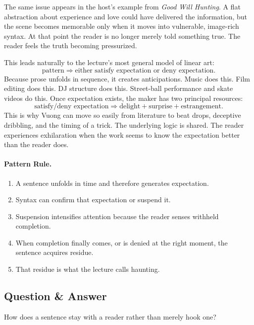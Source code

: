 The same issue appears in the host's example from \textit{Good Will Hunting}. A flat abstraction about experience and love could have delivered the information, but the scene becomes memorable only when it moves into vulnerable, image-rich syntax. At that point the reader is no longer merely told something true. The reader feels the truth becoming pressurized.

This leads naturally to the lecture's most general model of linear art:
\begin{equation}
\text{pattern} \Longrightarrow \text{either satisfy expectation or deny expectation}.
\end{equation}
Because prose unfolds in sequence, it creates anticipations. Music does this. Film editing does this. DJ structure does this. Street-ball performance and skate videos do this. Once expectation exists, the maker has two principal resources:
\begin{equation}
\text{satisfy/deny expectation} \Longrightarrow \text{delight} + \text{surprise} + \text{estrangement}.
\end{equation}
This is why Vuong can move so easily from literature to beat drops, deceptive dribbling, and the timing of a trick. The underlying logic is shared. The reader experiences exhilaration when the work seems to know the expectation better than the reader does.

\paragraph{Pattern Rule.}
\begin{enumerate}
\item A sentence unfolds in time and therefore generates expectation.
\item Syntax can confirm that expectation or suspend it.
\item Suspension intensifies attention because the reader senses withheld completion.
\item When completion finally comes, or is denied at the right moment, the sentence acquires residue.
\item That residue is what the lecture calls haunting.
\end{enumerate}

\subsection{Question \& Answer}

How does a sentence stay with a reader rather than merely hook one?

